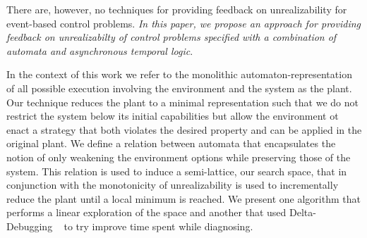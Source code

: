 There are, however, no techniques for providing feedback on unrealizability for 
event-based control problems. \emph{In this paper, we propose an approach for  
providing  feedback on unrealizabilty of control problems specified with a combination of 
automata and asynchronous temporal logic}.
%
%
%

In the context of this work we refer to the monolithic automaton-representation of all possible execution involving the environment and the system as the plant. Our technique reduces the plant to a minimal representation such that we do not restrict the system below its initial capabilities but allow the environment ot enact a strategy that both violates the desired property and can be applied in the original plant. We define a relation between automata that encapsulates the notion of only weakening the environment options while preserving those of the system. This relation is used to induce a semi-lattice, our search space, that in conjunction with the monotonicity of unrealizability is used to incrementally reduce the plant until a local minimum is reached. We present one algorithm that performs a linear exploration of the space and another that used Delta-Debugging ~\cite{DBLP:journals/tse/ZellerH02} to try improve time spent while diagnosing.


